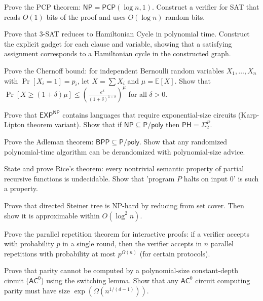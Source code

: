 \documentclass[12pt,a4paper]{exam}
\begin{document}
\begin{questions}
\vspace{0.3cm}

\question[4]
Prove the PCP theorem: $\mathsf{NP} = \mathsf{PCP}(\log n, 1)$. Construct a verifier for SAT that reads $O(1)$ bits of the proof and uses $O(\log n)$ random bits.

\vspace{0.3cm}

\question[6]
Prove that 3-SAT reduces to Hamiltonian Cycle in polynomial time. Construct the explicit gadget for each clause and variable, showing that a satisfying assignment corresponds to a Hamiltonian cycle in the constructed graph.

\vspace{0.3cm}

\question[3]
Prove the Chernoff bound: for independent Bernoulli random variables $X_1,\ldots,X_n$ with $\Pr[X_i = 1] = p_i$, let $X = \sum X_i$ and $\mu = \mathbb{E}[X]$. Show that $\Pr[X \geq (1+\delta)\mu] \leq (\frac{e^\delta}{(1+\delta)^{1+\delta}})^\mu$ for all $\delta > 0$.

\vspace{0.3cm}

\question[4]
Prove that $\mathsf{EXP}^{\mathsf{NP}}$ contains languages that require exponential-size circuits (Karp-Lipton theorem variant). Show that if $\mathsf{NP} \subseteq \mathsf{P}/\mathsf{poly}$ then $\mathsf{PH} = \Sigma_2^P$.

\vspace{0.3cm}

\question[2]
Prove the Adleman theorem: $\mathsf{BPP} \subseteq \mathsf{P}/\mathsf{poly}$. Show that any randomized polynomial-time algorithm can be derandomized with polynomial-size advice.

\vspace{0.3cm}

\question[5]
State and prove Rice's theorem: every nontrivial semantic property of partial recursive functions is undecidable. Show that 'program $P$ halts on input 0' is such a property.

\vspace{0.3cm}

\question[3]
Prove that directed Steiner tree is NP-hard by reducing from set cover. Then show it is approximable within $O(\log^2 n)$.

\vspace{0.3cm}

\question[4]
Prove the parallel repetition theorem for interactive proofs: if a verifier accepts with probability $p$ in a single round, then the verifier accepts in $n$ parallel repetitions with probability at most $p^{\Omega(n)}$ (for certain protocols).

\vspace{0.3cm}

\question[4]
Prove that parity cannot be computed by a polynomial-size constant-depth circuit ($\mathsf{AC}^0$) using the switching lemma. Show that any $\mathsf{AC}^0$ circuit computing parity must have size $\exp(\Omega(n^{1/(d-1)}))$.

\vspace{0.3cm}

\end{questions}
\end{document}
